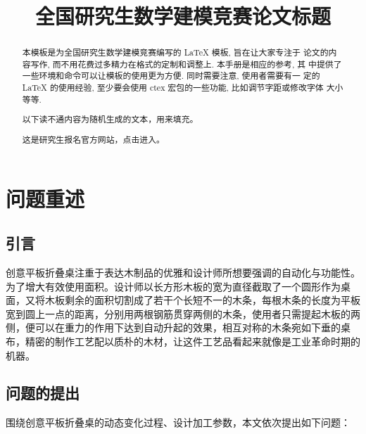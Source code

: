 \documentclass[bwprint]{gmcmthesis}
\title{全国研究生数学建模竞赛论文标题}
\numberwithin{equation}{section}
\numberwithin{figure}{section}
\numberwithin{table}{section}
\begin{document}
 \maketitle

\begin{abstract}
本模板是为全国研究生数学建模竞赛编写的 \LaTeX{} 模板, 旨在让大家专注于
论文的内容写作, 而不用花费过多精力在格式的定制和调整上. 本手册是相应的参考, 其
中提供了一些环境和命令可以让模板的使用更为方便. 同时需要注意, 使用者需要有一
定的 \LaTeX{} 的使用经验, 至少要会使用 ctex 宏包的一些功能, 比如调节字距或修改字体
大小等等.

\textcolor[rgb]{1.00,0.00,0.00}{以下读不通内容为随机生成的文本，用来填充。}


这是研究生报名官方网站，点击\href{https://cpipc.chinadegrees.cn}{}进入。


\end{abstract}

\pagestyle{plain}

\tableofcontents

\clearpage
\section{问题重述}

\subsection{引言}   %

创意平板折叠桌注重于表达木制品的优雅和设计师所想要强调的自动化与功能性。为了增大有效使用面积。设计师以长方形木板的宽为直径截取了一个圆形作为桌面，又将木板剩余的面积切割成了若干个长短不一的木条，每根木条的长度为平板宽到圆上一点的距离，分别用两根钢筋贯穿两侧的木条，使用者只需提起木板的两侧，便可以在重力的作用下达到自动升起的效果，相互对称的木条宛如下垂的桌布，精密的制作工艺配以质朴的木材，让这件工艺品看起来就像是工业革命时期的机器。


\subsection{问题的提出}


\noindent 围绕创意平板折叠桌的动态变化过程、设计加工参数，本文依次提出如下问题：
\end{document}
